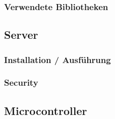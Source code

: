        \subsubsection{Verwendete Bibliotheken}

\subsection{Server}
    
    \subsubsection{Installation / Ausführung}
    \subsubsection{Security}

\subsection{Microcontroller}
    
    